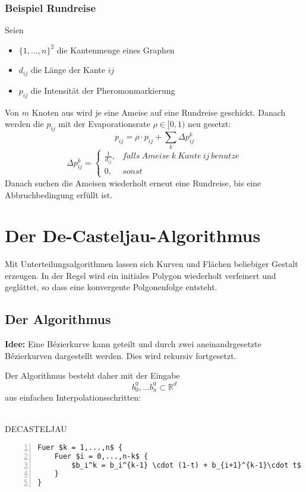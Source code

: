 \subsubsection{Beispiel Rundreise}
Seien
\begin{itemize}
	\item \(\{1,...,n\}^2\) die Kantenmenge eines Graphen
	\item \(d_{ij}\) die Länge der Kante \(ij\)
	\item \(p_{ij}\) die Intensität der Pheromonmarkierung
\end{itemize}
Von \(m\) Knoten aus wird je eine Ameise auf eine Rundreise geschickt. Danach werden die \(p_{ij}\) mit der Evaporationsrate \(\rho \in \lbrack 0,1)\) neu gesetzt:
\[p_{ij} = \rho \cdot p_{ij} + \sum_k \Delta p_{ij}^k\]
\[\Delta p_{ij}^k = \begin{cases} \frac{1}{d_{ij}}, & falls~Ameise~k~Kante~ij~benutze \\ 0, & sonst \end{cases}\]
Danach suchen die Ameisen wiederholt erneut eine Rundreise, bis eine Abbruchbedingung erfüllt ist.



\section{Der De-Casteljau-Algorithmus}
Mit Unterteilungsalgorithmen lassen sich Kurven und Flächen beliebiger Gestalt erzeugen. In der Regel wird ein initiales Polygon wiederholt verfeinert und geglättet, so dass eine konvergente Polgonenfolge entsteht.

\subsection{Der Algorithmus}
\textbf{Idee:} Eine Bézierkurve kann geteilt und durch zwei aneinandrgesetzte Bézierkurven dargestellt werden. Dies wird rekursiv fortgesetzt.

Der Algorithmus besteht daher mit der Eingabe
\[b_0^0,...b_n^0 \subset \mathbb{R}^d\]
aus einfachen Interpolationsschritten:
\\\\
\begin{minipage}{\textwidth}
DECASTELJAU
\begin{lstlisting}[frame=single,numbers=left,mathescape]
Fuer $k = 1,...,n$ {
	Fuer $i = 0,...,n-k$ {
		$b_i^k = b_i^{k-1} \cdot (1-t) + b_{i+1}^{k-1}\cdot t$ 
	}
}
\end{lstlisting}
\end{minipage}


